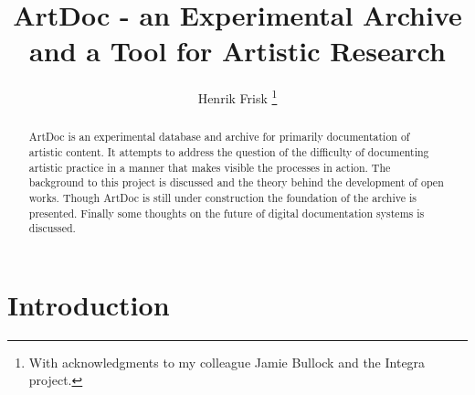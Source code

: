 \documentclass[runningheads,a4paper]{llncs}
\begin{document}
\mainmatter  %

\title{ArtDoc - an Experimental Archive and a Tool for Artistic Research}


%
%
\author{Henrik Frisk \thanks{With acknowledgments to my colleague Jamie Bullock and the Integra project.}}
%


%
%


\maketitle


\begin{abstract}
ArtDoc is an experimental database and archive for primarily documentation of artistic content. It attempts to address the question of the difficulty of documenting artistic practice in a manner that makes visible the processes in action. The background to this project is discussed and the theory behind the development of open works. Though ArtDoc is still under construction the foundation of the archive is presented. Finally some thoughts on the future of digital documentation systems is discussed.

\end{abstract}


\section{Introduction}
\label{sec:introduction}
\end{document}
